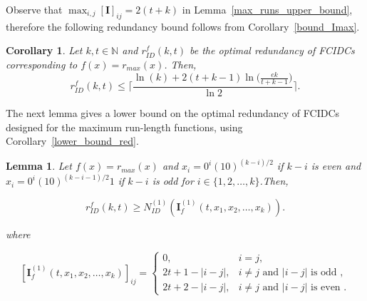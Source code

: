 \documentclass[11 pt]{article}
\numberwithin{equation}{section}
\newtheorem{corollary}[theorem]{Corollary}
\newtheorem{lemma}[theorem]{Lemma}
\begin{document}
    Observe that $\max_{i,j}[\mathbf{I}]_{ij} = 2(t+k)$ in Lemma~\ref{max_runs_upper_bound}, therefore the following redundancy bound follows from Corollary~\ref{bound_Imax}.

    \begin{corollary}
        Let $k,t \in \mathbb{N}$ and $r_{ID}^f(k,t)$ be the optimal redundancy of FCIDCs corresponding to $f(x) = r_{max}(x)$. Then,
        \[
                r_{ID}^f(k,t) \leq \Bigg \lceil \frac{\ln (k) + 2(t+k-1)\ln \Big(\frac{ek}{t+ k - 1}\Big)}{\ln 2} \Bigg \rceil.
        \]
    \end{corollary}
        
    

    The next lemma gives a lower bound on the optimal redundancy of FCIDCs designed for the maximum run-length functions, using Corollary~\ref{lower_bound_red}.
    \begin{lemma}\label{max_lower_bound}
        Let $f(x) = r_{max}(x)$ and $x_i =0^i(10)^{(k-i)/2}$ if $k-i$ is even and $x_i =0^i(10)^{(k-i-1)/2}1$ if $k-i$ is odd for $i \in \{1,2,\ldots,k\}$.Then,
        
          \[
            r_{ID}^f(k,t) \geq N_{ID}^{(1)}(\boldsymbol{I}_f^{(1)}(t, x_1, x_2, \ldots, x_k)).
          \]  
        
        where
        
        \[
            [\boldsymbol{I}_f^{(1)}(t, x_1, x_2, \ldots, x_k)]_{ij}=
            \begin{cases}
                0,  & i = j, \\[4pt]
                2t + 1 - |i - j| , & i \neq j \text{ and } |i-j| \text{ is odd },\\
                2t + 2 - |i-j|,    & i \neq j \text{ and } |i-j| \text{ is even }. 
            \end{cases}
        \]
        
    \end{lemma}
\end{document}
